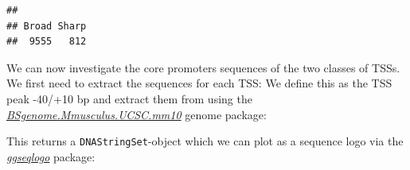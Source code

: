 \documentclass[9pt,a4paper,]{extarticle}
\newenvironment{Shaded}{\begin{snugshade}}{\end{snugshade}}
\newcommand{\KeywordTok}[1]{\textcolor[rgb]{0.13,0.29,0.53}{\textbf{{#1}}}}
\newcommand{\DataTypeTok}[1]{\textcolor[rgb]{0.13,0.29,0.53}{{#1}}}
\newcommand{\DecValTok}[1]{\textcolor[rgb]{0.00,0.00,0.81}{{#1}}}
\newcommand{\StringTok}[1]{\textcolor[rgb]{0.31,0.60,0.02}{{#1}}}
\newcommand{\CommentTok}[1]{\textcolor[rgb]{0.56,0.35,0.01}{\textit{{#1}}}}
\newcommand{\NormalTok}[1]{{#1}}
\begin{document}
\begin{Shaded}
\end{Shaded}

\begin{verbatim}
## 
## Broad Sharp 
##  9555   812
\end{verbatim}

We can now investigate the core promoters sequences of the two classes of TSSs. We first need to extract the sequences for each TSS: We define this as the TSS peak -40/+10 bp and extract them from using the \emph{\href{https://bioconductor.org/packages/3.8/BSgenome.Mmusculus.UCSC.mm10}{BSgenome.Mmusculus.UCSC.mm10}} genome package:

\begin{Shaded}
\end{Shaded}

This returns a \texttt{DNAStringSet}-object which we can plot as a sequence logo \citep{Manetti2015} via the \emph{\href{https://CRAN.R-project.org/package=ggseqlogo}{ggseqlogo}} package\citep{Wagih2017}:

\begin{Shaded}
\end{Shaded}
\end{document}

